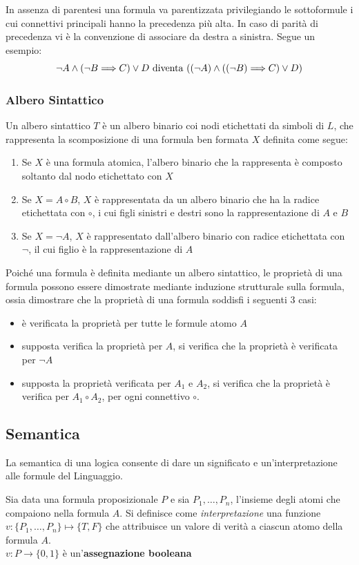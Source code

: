 \documentclass[a4paper,12pt, oneside]{book}
\begin{document}
In assenza di parentesi una formula va parentizzata privilegiando le
sottoformule 
i cui connettivi principali hanno la precedenza più alta.\newline
In caso di parità di precedenza vi è la convenzione di associare da destra a
sinistra. Segue un esempio:
$$
\neg A \land (\neg B {\implies} C) \lor D 
\hbox{ diventa }
((\neg A) \land ((\neg B) {\implies} C) \lor D)
$$
\subsubsection{Albero Sintattico}
\begin{definizione}
  Un albero sintattico $T$ è un albero binario coi nodi etichettati da simboli
  di $L$, che rappresenta la scomposizione di una formula ben formata $X$
  definita 
  come segue: 
\end{definizione}
\begin{enumerate}
  \item Se $X$ è una formula atomica, l'albero binario che la rappresenta è
  composto 
  soltanto dal nodo etichettato con $X$
  \item Se $X = A \circ B$, $X$ è rappresentata da un albero binario che ha la
  radice 
  etichettata con $\circ$, i cui figli sinistri e destri sono la
  rappresentazione di $A$ e $B$ 
  \item Se $X = \neg A$, $X$ è rappresentato dall'albero binario con radice
  etichettata 
  con $\neg$, il cui figlio è la rappresentazione di $A$
\end{enumerate}

Poiché una formula è definita mediante un albero sintattico, le proprietà di una
formula 
possono essere dimostrate mediante induzione strutturale sulla formula, ossia
dimostrare 
che la proprietà di una formula soddisfi i seguenti 3 casi:
\begin{itemize}
  \item è verificata la proprietà per tutte le formule atomo $A$
  \item supposta verifica la proprietà per $A$, si verifica che la proprietà è
  verificata per $\neg A$ 
  \item supposta la proprietà verificata per $A_1$ e $A_2$, si verifica che la
  proprietà è verifica per $A_1 \circ A_2$, per ogni connettivo $\circ$.
\end{itemize}
\newpage
\subsection{Semantica}
La semantica di una logica consente di dare un significato e un'interpretazione
alle formule del Linguaggio.\newline
\begin{definizione}
  Sia data una formula proposizionale $P$ e sia ${P_1,\dots,P_n}$, l'insieme
  degli 
  atomi che compaiono nella formula $A$. Si definisce come
  \emph{interpretazione} una 
  funzione $v:\{P_1,\dots,P_n\} \mapsto \{T,F\}$ che attribuisce un valore di
  verità 
  a ciascun atomo della formula $A$.
  \\
  $v:P\to\{0,1\}$ è un'\textbf{assegnazione booleana} 
\end{definizione}
\end{document}
